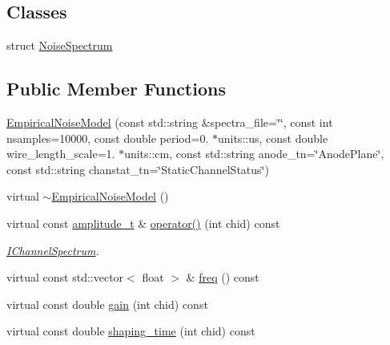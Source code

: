 \subsection*{Classes}
\begin{DoxyCompactItemize}
\item 
struct \hyperlink{struct_wire_cell_1_1_gen_1_1_empirical_noise_model_1_1_noise_spectrum}{Noise\+Spectrum}
\end{DoxyCompactItemize}
\subsection*{Public Member Functions}
\begin{DoxyCompactItemize}
\item 
\hyperlink{class_wire_cell_1_1_gen_1_1_empirical_noise_model_a3478b5daf202fbb7f923664ac21fdeb5}{Empirical\+Noise\+Model} (const std\+::string \&spectra\+\_\+file=\char`\"{}\char`\"{}, const int nsamples=10000, const double period=0. $\ast$units\+::us, const double wire\+\_\+length\+\_\+scale=1. $\ast$units\+::cm, const std\+::string anode\+\_\+tn=\char`\"{}Anode\+Plane\char`\"{}, const std\+::string chanstat\+\_\+tn=\char`\"{}Static\+Channel\+Status\char`\"{})
\item 
virtual \hyperlink{class_wire_cell_1_1_gen_1_1_empirical_noise_model_a4de4558ce8eb7aa69193a315741eadc6}{$\sim$\+Empirical\+Noise\+Model} ()
\item 
virtual const \hyperlink{class_wire_cell_1_1_i_channel_spectrum_a9af7bfed961f49dc8a532fd5d0bf3e6e}{amplitude\+\_\+t} \& \hyperlink{class_wire_cell_1_1_gen_1_1_empirical_noise_model_a9ed3c28256c1c262064c62816b4b225f}{operator()} (int chid) const
\begin{DoxyCompactList}\small\item\em \hyperlink{class_wire_cell_1_1_i_channel_spectrum}{I\+Channel\+Spectrum}. \end{DoxyCompactList}\item 
virtual const std\+::vector$<$ float $>$ \& \hyperlink{class_wire_cell_1_1_gen_1_1_empirical_noise_model_a10ae08668a26ca0818608a4d653dea1c}{freq} () const
\item 
virtual const double \hyperlink{class_wire_cell_1_1_gen_1_1_empirical_noise_model_a783b81a925de0823c63ade8b242033e8}{gain} (int chid) const
\item 
virtual const double \hyperlink{class_wire_cell_1_1_gen_1_1_empirical_noise_model_ada27f0991c188eb877a6702bb0878805}{shaping\+\_\+time} (int chid) const
\item 

\end{DoxyCompactItemize}
